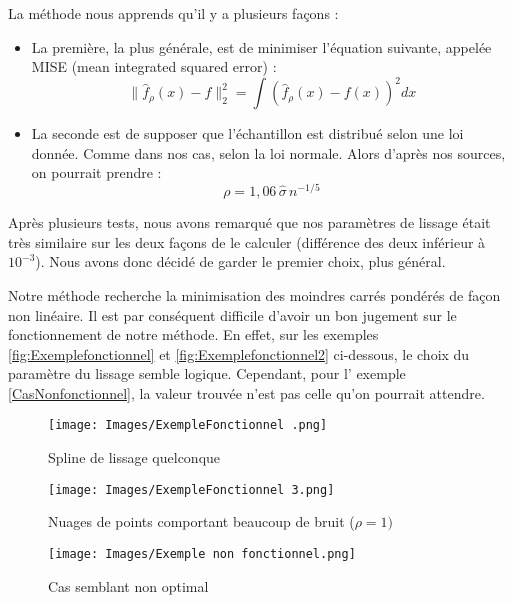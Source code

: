 \documentclass[a4paper,12pt]{article} %
\begin{document}
                La méthode nous apprends qu'il y a plusieurs façons :
                \begin{itemize}
                        \item   La première, la plus générale, est de minimiser l'équation suivante, appelée MISE (mean integrated squared error) \cite{MISE} :
                        \[\|{\widehat{f}}_{\rho}(x)-f\|_{2}^{2}=\operatorname \int ({\widehat{f}}_{\rho}(x)-f(x))^{2}dx\]
                        \item 	La seconde est de supposer que l'échantillon est distribué selon une loi donnée. Comme dans nos cas, selon la loi normale. Alors d'après nos sources, on pourrait prendre : 
                        \[ \rho=1,06\,{\widehat {\sigma }}\,n^{-1/5}\]
                \end{itemize}
                
                Après plusieurs tests, nous avons remarqué que nos paramètres de lissage était très similaire sur les deux façons de le calculer (différence des deux inférieur à $10^{-3}$). Nous avons donc décidé de garder le premier choix, plus général.
                
                Notre méthode recherche la minimisation des moindres carrés pondérés de façon non linéaire. Il est par conséquent difficile d'avoir un bon jugement sur le fonctionnement de notre méthode. En effet, sur les exemples \ref{fig:Exemplefonctionnel} et \ref{fig:Exemplefonctionnel2}  ci-dessous, le choix du paramètre du lissage semble logique. Cependant, pour l' exemple \ref{CasNonfonctionnel}, la valeur trouvée n'est pas celle qu'on pourrait attendre.

                
                \begin{figure}[H]
                    \texttt{[image: Images/ExempleFonctionnel .png]}
                     \caption{Spline de lissage quelconque}\label{fig:Exemplefonctionnel}
                \endminipage\hfill
                    \texttt{[image: Images/ExempleFonctionnel 3.png]}
                     \caption{Nuages de points comportant beaucoup de bruit ($\rho = 1)$ }\label{fig:Exemplefonctionnel2}
                \endminipage\hfill
                    \texttt{[image: Images/Exemple non fonctionnel.png]}
                    \caption{Cas semblant non optimal}\label{fig:ExempleNonfonctionnel1}
                \endminipage
                \end{figure}
\end{document}
